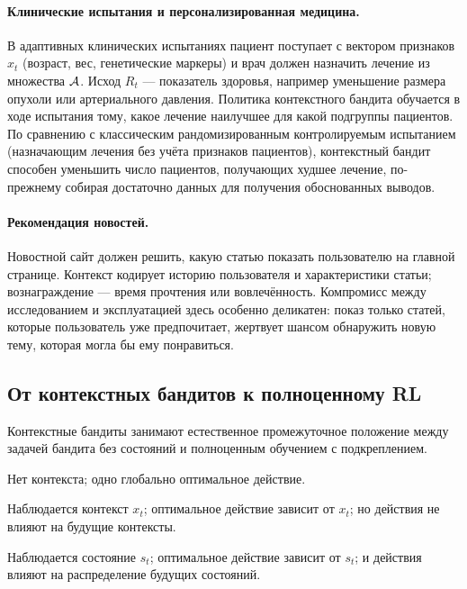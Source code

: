 \paragraph{Клинические испытания и персонализированная медицина.}
В адаптивных клинических испытаниях пациент поступает с вектором признаков $x_t$ (возраст, вес, генетические маркеры) и врач должен назначить лечение из множества $\mathcal{A}$.  Исход $R_t$ — показатель здоровья, например уменьшение размера опухоли или артериального давления.  Политика контекстного бандита обучается в ходе испытания тому, какое лечение наилучшее для какой подгруппы пациентов.  По сравнению с классическим рандомизированным контролируемым испытанием (назначающим лечения без учёта признаков пациентов), контекстный бандит способен уменьшить число пациентов, получающих худшее лечение, по-прежнему собирая достаточно данных для получения обоснованных выводов.

\paragraph{Рекомендация новостей.}
Новостной сайт должен решить, какую статью показать пользователю на главной странице.  Контекст кодирует историю пользователя и характеристики статьи; вознаграждение — время прочтения или вовлечённость.  Компромисс между исследованием и эксплуатацией здесь особенно деликатен: показ только статей, которые пользователь уже предпочитает, жертвует шансом обнаружить новую тему, которая могла бы ему понравиться.

\subsection*{От контекстных бандитов к полноценному RL}

Контекстные бандиты занимают естественное промежуточное положение между задачей бандита без состояний и полноценным обучением с подкреплением.

\begin{description}[leftmargin=!, labelwidth=4cm]
\item[Бандиты без состояний] Нет контекста; одно глобально оптимальное действие.
\item[Контекстные бандиты] Наблюдается контекст $x_t$; оптимальное действие зависит от $x_t$; но действия не влияют на будущие контексты.
\item[Полноценный RL (MDP)] Наблюдается состояние $s_t$; оптимальное действие зависит от $s_t$; и действия влияют на распределение будущих состояний.
\end{description}

